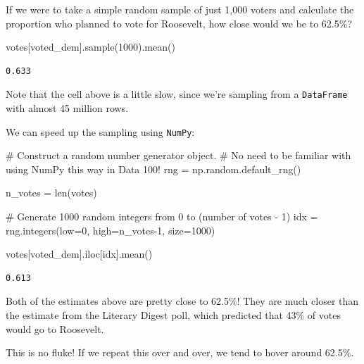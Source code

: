 \documentclass[
  letterpaper,
  DIV=11,
  numbers=noendperiod]{scrreprt}
\newenvironment{Shaded}{\begin{snugshade}}{\end{snugshade}}
\newcommand{\BuiltInTok}[1]{\textcolor[rgb]{0.00,0.23,0.31}{#1}}
\newcommand{\CommentTok}[1]{\textcolor[rgb]{0.37,0.37,0.37}{#1}}
\newcommand{\DecValTok}[1]{\textcolor[rgb]{0.68,0.00,0.00}{#1}}
\newcommand{\NormalTok}[1]{\textcolor[rgb]{0.00,0.23,0.31}{#1}}
\newcommand{\OperatorTok}[1]{\textcolor[rgb]{0.37,0.37,0.37}{#1}}
\newcommand{\StringTok}[1]{\textcolor[rgb]{0.13,0.47,0.30}{#1}}
\begin{document}
If we were to take a simple random sample of just 1,000 voters and
calculate the proportion who planned to vote for Roosevelt, how close
would we be to 62.5\%?

\begin{Shaded}
\begin{Highlighting}[]
\NormalTok{votes[}\StringTok{\textquotesingle{}voted\_dem\textquotesingle{}}\NormalTok{].sample(}\DecValTok{1000}\NormalTok{).mean()}
\end{Highlighting}
\end{Shaded}

\begin{verbatim}
0.633
\end{verbatim}

Note that the cell above is a little slow, since we're sampling from a
\texttt{DataFrame} with almost 45 million rows.

We can speed up the sampling using \texttt{NumPy}:

\begin{Shaded}
\begin{Highlighting}[]
\CommentTok{\# Construct a random number generator object.}
\CommentTok{\# No need to be familiar with using NumPy this way in Data 100!}
\NormalTok{rng }\OperatorTok{=}\NormalTok{ np.random.default\_rng()}

\NormalTok{n\_votes }\OperatorTok{=} \BuiltInTok{len}\NormalTok{(votes)}

\CommentTok{\# Generate 1000 random integers from 0 to (number of votes {-} 1)}
\NormalTok{idx }\OperatorTok{=}\NormalTok{ rng.integers(low}\OperatorTok{=}\DecValTok{0}\NormalTok{, high}\OperatorTok{=}\NormalTok{n\_votes}\OperatorTok{{-}}\DecValTok{1}\NormalTok{, size}\OperatorTok{=}\DecValTok{1000}\NormalTok{)}

\NormalTok{votes[}\StringTok{\textquotesingle{}voted\_dem\textquotesingle{}}\NormalTok{].iloc[idx].mean()}
\end{Highlighting}
\end{Shaded}

\begin{verbatim}
0.613
\end{verbatim}

Both of the estimates above are pretty close to 62.5\%! They are much
closer than the estimate from the Literary Digest poll, which predicted
that 43\% of votes would go to Roosevelt.

This is no fluke! If we repeat this over and over, we tend to hover
around 62.5\%.
\end{document}
